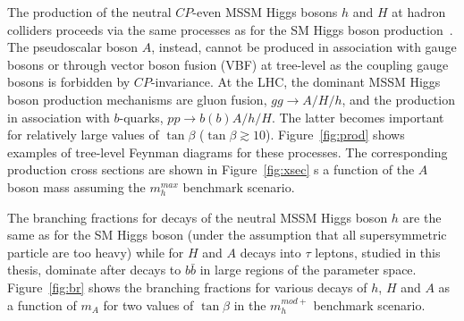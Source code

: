 The production of the neutral $CP$-even MSSM Higgs bosons $h$ and $H$ at hadron
colliders proceeds via the same processes as for the SM Higgs
boson production~\cite{LHCxsec1}. The pseudoscalar boson $A$, instead, cannot be produced
in association with gauge bosons or through  vector boson fusion (VBF) at
tree-level as the coupling gauge bosons is forbidden by $CP$-invariance.  At
the LHC,  the dominant  MSSM Higgs boson production mechanisms 
are gluon fusion, $gg\rightarrow A/H/h$, and the production in association with $b$-quarks, $pp \rightarrow b(b)A/h/H$.
The latter becomes important for relatively large values of $\tan\beta$ ($\tan\beta \apprge 10$). 
Figure~\ref{fig:prod} shows examples of tree-level  Feynman diagrams for these processes. 
The corresponding production cross sections are shown in Figure~\ref{fig:xsec}  s a function of the 
$A$ boson mass assuming the $m_h^{max}$ benchmark scenario.


The branching fractions for decays of the neutral
MSSM Higgs boson $h$ are the same as for the SM Higgs boson (under the assumption that all supersymmetric particle
are too heavy) while for $H$ and $A$  decays into $\tau$ leptons, studied in this thesis, 
dominate after decays to $b\bar{b}$ in large regions of the parameter space.
Figure~\ref{fig:br} shows the  branching fractions for various decays of $h$, $H$ and $A$ 
as a  function of $m_A$ for two values of $\tan \beta$ in the  $m_h^{mod+}$ benchmark scenario.


